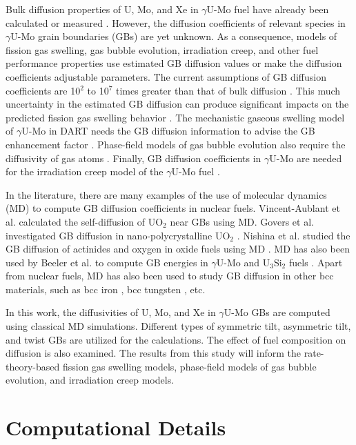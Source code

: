 \documentclass{elsarticle}
\begin{document}
Bulk diffusion properties of U, Mo, and Xe in $\gamma$U-Mo fuel have already been calculated \cite{smirnova2015, park2021} or measured \cite{huang2013}. However, the diffusion coefficients of relevant species in $\gamma$U-Mo grain boundaries (GBs) are yet unknown. As a consequence, models of fission gas swelling, gas bubble evolution, irradiation creep, and other fuel performance properties use estimated GB diffusion values or make the diffusion coefficients adjustable parameters. The current assumptions of GB diffusion coefficients are 10$^2$ to 10$^7$ times greater than that of bulk diffusion \cite{annualreport2021, ye2015}. This much uncertainty in the estimated GB diffusion can produce significant impacts on the predicted fission gas swelling behavior \cite{annualreport2022}. The mechanistic gaseous swelling model of $\gamma$U-Mo in DART \cite{dart} needs the GB diffusion information to advise the GB enhancement factor \cite{cui2015, annualreport2021}. Phase-field models of gas bubble evolution also require the diffusivity of gas atoms \cite{hu2021, annualreport2021}. Finally, GB diffusion coefficients in $\gamma$U-Mo are needed for the irradiation creep model of the $\gamma$U-Mo fuel \cite{annualreport2022}.

In the literature, there are many examples of the use of molecular dynamics (MD) to compute GB diffusion coefficients in nuclear fuels. Vincent-Aublant et al. \cite{vincent2009} calculated the self-diffusion of UO$_2$ near GBs using MD. Govers et al. investigated GB diffusion in nano-polycrystalline UO$_2$ \cite{govers2013}. Nishina et al. studied the GB diffusion of actinides and oxygen in oxide fuels using MD \cite{nishina2011}. MD has also been used by Beeler et al. to compute GB energies in $\gamma$U-Mo and U$_3$Si$_2$ fuels \cite{beeler2018, beeler2019}. Apart from nuclear fuels, MD has also been used to study GB diffusion in other bcc materials, such as bcc iron  \cite{yang2018}, bcc tungsten \cite{fu2021}, etc.

In this work, the diffusivities of U, Mo, and Xe in $\gamma$U-Mo GBs are computed using classical MD simulations. Different types of symmetric tilt, asymmetric tilt, and twist GBs are utilized for the calculations. The effect of fuel composition on diffusion is also examined. The results from this study will inform the rate-theory-based fission gas swelling models, phase-field models of gas bubble evolution, and irradiation creep models.


\section{Computational Details}
\end{document}
